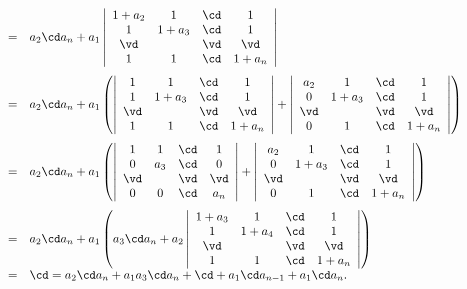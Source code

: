 \begin{frame}

$$
\begin{array}{rcl}
  \qquad &=&a_2\cd a_n +a_1\left|
                 \begin{array}{cccc}
                   1+a_2&1&\cd&1\\
                   1&1+a_3&\cd&1\\
                   \vd&&\vd&\vd\\
                   1&1&\cd&1+a_n\\        
                 \end{array}
  \right| \\[0.35in]
             &=&a_2\cd a_n +a_1\left(\left|
                 \begin{array}{cccc}
                   1&1&\cd&1\\
                   1&1+a_3&\cd&1\\
                   \vd&&\vd&\vd\\
                   1&1&\cd&1+a_n\\        
                 \end{array}
  \right|+\left|
  \begin{array}{cccc}
    a_2&1&\cd&1\\
    0&1+a_3&\cd&1\\
    \vd&&\vd&\vd\\
    0&1&\cd&1+a_n\\        
  \end{array}
  \right|\right) \\[0.35in]
             &=&a_2\cd a_n +a_1\left(\left|
                 \begin{array}{cccc}
                   1&1&\cd&1\\
                   0&a_3&\cd&0\\
                   \vd&&\vd&\vd\\
                   0&0&\cd&a_n\\        
                 \end{array}
  \right|+\left|
  \begin{array}{cccc}
    a_2&1&\cd&1\\
    0&1+a_3&\cd&1\\
    \vd&&\vd&\vd\\
    0&1&\cd&1+a_n\\        
  \end{array}
  \right|\right) \\[0.35in]
             &=&a_2\cd a_n +a_1\left(a_3\cd a_n+a_2\left|
                 \begin{array}{cccc}
                   1+a_3&1&\cd&1\\
                   1&1+a_4&\cd&1\\
                   \vd&&\vd&\vd\\
                   1&1&\cd&1+a_n\\        
                 \end{array}
  \right|\right) \\[0.2in]
             &=& \cd = a_2\cd a_n + a_1a_3\cd a_n + \cd + a_1\cd a_{n-1} + a_1 \cd a_n.
\end{array}
$$
\end{frame}

